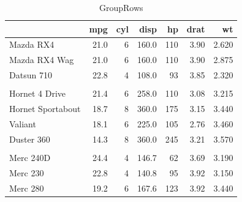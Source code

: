 \documentclass[
	12pt,				%
	openright,			%
	oneside,      %
	a4paper,			%
	english,			%
	french,				%
	spanish,			%
	brazil,				%
	]{abntex2}\usepackage[]{graphicx}\usepackage[]{xcolor}
\newenvironment{knitrout}{}{} %
\begin{document}
\begin{apendicesenv}
\begin{knitrout}
\begin{table}
\caption{\label{tab:script}GroupRows}
\centering
\begin{tabular}[t]{lrrrrrr}
\toprule
  & mpg & cyl & disp & hp & drat & wt\\
\midrule
Mazda RX4 & 21.0 & 6 & 160.0 & 110 & 3.90 & 2.620\\
Mazda RX4 Wag & 21.0 & 6 & 160.0 & 110 & 3.90 & 2.875\\
Datsun 710 & 22.8 & 4 & 108.0 & 93 & 3.85 & 2.320\\
\addlinespace[0.3em]
\multicolumn{7}{l}{\textbf{Group1}}\\
\hspace{1em}Hornet 4 Drive & 21.4 & 6 & 258.0 & 110 & 3.08 & 3.215\\
\hspace{1em}Hornet Sportabout & 18.7 & 8 & 360.0 & 175 & 3.15 & 3.440\\
\hspace{1em}Valiant & 18.1 & 6 & 225.0 & 105 & 2.76 & 3.460\\
\hspace{1em}Duster 360 & 14.3 & 8 & 360.0 & 245 & 3.21 & 3.570\\
\addlinespace[0.3em]
\multicolumn{7}{l}{\textbf{Group2}}\\
\hspace{1em}Merc 240D & 24.4 & 4 & 146.7 & 62 & 3.69 & 3.190\\
\hspace{1em}Merc 230 & 22.8 & 4 & 140.8 & 95 & 3.92 & 3.150\\
\hspace{1em}Merc 280 & 19.2 & 6 & 167.6 & 123 & 3.92 & 3.440\\
\bottomrule
\end{tabular}
\end{table}

\end{knitrout}


\end{apendicesenv}
\end{document}
